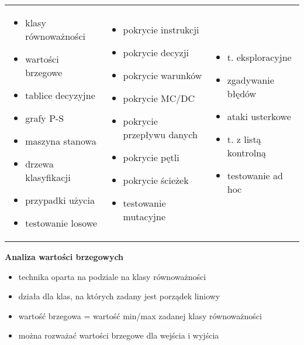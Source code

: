 \documentclass[../main.tex]{subfiles}
\begin{document}
\begin{table}[H]
\begin{center}
\begin{tabular}{ p{5cm} p{5cm} p{5cm} }
                \begin{itemize}
                    \item klasy równoważności
                    \item wartości brzegowe
                    \item tablice decyzyjne
                    \item grafy P-S
                    \item maszyna stanowa
                    \item drzewa klasyfikacji
                    \item przypadki użycia
                    \item testowanie losowe
                \end{itemize}
                &
                \begin{itemize}
                    \item pokrycie instrukcji
                    \item pokrycie decyzji
                    \item pokrycie warunków
                    \item pokrycie MC/DC
                    \item pokrycie przepływu danych
                    \item pokrycie pętli
                    \item pokrycie ścieżek
                    \item testowanie mutacyjne
                \end{itemize}
                &
                \begin{itemize}
                    \item t. eksploracyjne
                    \item zgadywanie błędów
                    \item ataki usterkowe
                    \item t. z listą kontrolną
                    \item testowanie ad hoc
                \end{itemize}\\
            \end{tabular}
        \end{center}
    \end{table}

    \textbf{Analiza wartości brzegowych}
    \begin{itemize}
        \item technika oparta na podziale na klasy równoważności
        \item działa dla klas, na których zadany jest porządek liniowy
        \item wartość brzegowa = wartość min/max zadanej klasy równoważności
        \item można rozważać wartości brzegowe dla wejścia i wyjścia
    \end{itemize}
\end{document}
